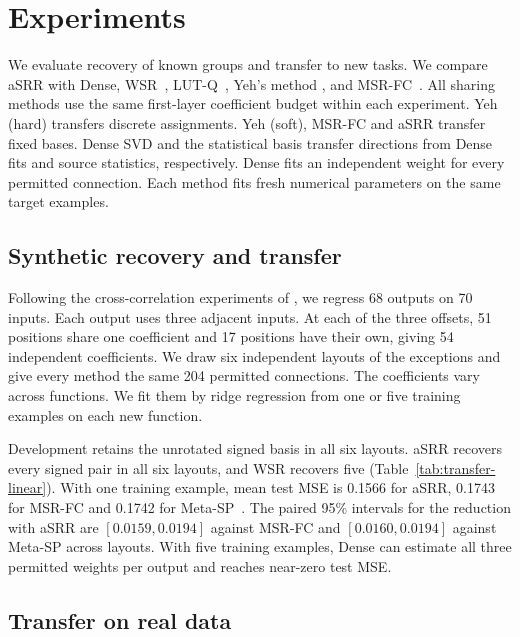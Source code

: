 \section{Experiments}
\label{sec:experiments}

We evaluate recovery of known groups and transfer to new tasks.
We compare aSRR with Dense, WSR~\cite{shakerinava2024weight},
LUT-Q~\cite{cardinaux2018iteratively}, Yeh's method
\cite{yeh2022equivariance}, and MSR-FC~\cite{zhou2021meta}.
All sharing methods use the same first-layer coefficient budget
within each experiment. Yeh (hard) transfers discrete assignments.
Yeh (soft), MSR-FC and aSRR transfer fixed bases. Dense SVD and the
statistical basis transfer directions from Dense fits and source
statistics, respectively. Dense fits an independent weight for every
permitted connection. Each method fits fresh numerical parameters on the
same target examples.

\subsection{Synthetic recovery and transfer}

Following the cross-correlation experiments of
\citet{zhou2021meta,yeh2022equivariance}, we regress 68 outputs on
70 inputs. Each output uses three adjacent inputs. At each of the
three offsets, 51 positions share one coefficient and 17 positions
have their own, giving 54 independent coefficients. We draw six
independent layouts of the exceptions and give every method the same
204 permitted connections. The coefficients vary across functions.
We fit them by ridge regression from one or five training examples
on each new function.



Development retains the unrotated signed basis in all six layouts.
aSRR recovers every signed pair in all six layouts, and WSR recovers five
(Table~\ref{tab:transfer-linear}). With one training example, mean test
MSE is 0.1566 for aSRR, 0.1743 for MSR-FC and 0.1742 for
Meta-SP~\citep{zhang2026metasp}. The paired 95\% intervals for the
reduction with aSRR are $[0.0159,0.0194]$ against MSR-FC and
$[0.0160,0.0194]$ against Meta-SP across layouts.
With five training examples, Dense can estimate all three permitted
weights per output and reaches near-zero test MSE.

\subsection{Transfer on real data}

